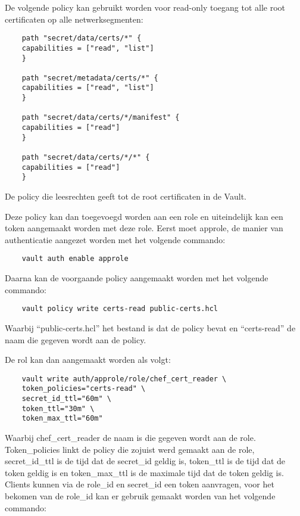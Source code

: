 De volgende policy kan gebruikt worden voor read-only toegang tot alle root certificaten op alle netwerksegmenten:
\begin{listing}[H]
\begin{verbatim}     
    path "secret/data/certs/*" {
    capabilities = ["read", "list"]
    }

    path "secret/metadata/certs/*" {
    capabilities = ["read", "list"]
    }

    path "secret/data/certs/*/manifest" {
    capabilities = ["read"]
    }

    path "secret/data/certs/*/*" {
    capabilities = ["read"]
    }
\end{verbatim}
\caption[Policy met leesrechten tot de Vault]{De policy die leesrechten geeft tot de root certificaten in de Vault.}
\end{listing}

Deze policy kan dan toegevoegd worden aan een role en uiteindelijk kan een token aangemaakt worden met deze role.
Eerst moet approle, de manier van authenticatie aangezet worden met het volgende commando:

\begin{verbatim}
    vault auth enable approle
\end{verbatim}

Daarna kan de voorgaande policy aangemaakt worden met het volgende commando:

\begin{verbatim}
    vault policy write certs-read public-certs.hcl
\end{verbatim}

Waarbij ``public-certs.hcl'' het bestand is dat de policy bevat en ``certs-read'' de naam die gegeven wordt aan de policy. \\

\pagebreak

De rol kan dan aangemaakt worden als volgt:
\begin{verbatim}
    vault write auth/approle/role/chef_cert_reader \
    token_policies="certs-read" \
    secret_id_ttl="60m" \
    token_ttl="30m" \
    token_max_ttl="60m"
\end{verbatim}
Waarbij chef\_cert\_reader de naam is die gegeven wordt aan de role. Token\_policies linkt de policy die zojuist werd gemaakt aan de role, secret\_id\_ttl is de tijd dat de secret\_id geldig is, token\_ttl is de tijd dat de token geldig is en token\_max\_ttl is de maximale tijd dat de token geldig is.
Clients kunnen via de role\_id en secret\_id een token aanvragen, voor het bekomen van de role\_id kan er gebruik gemaakt worden van het volgende commando:

